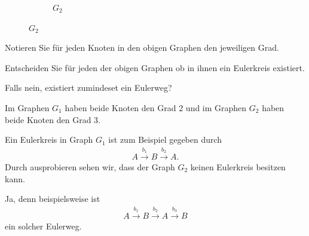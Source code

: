 \begin{myexercise}
\begin{figure}[H]
\begin{subfigure}[b]{0.4\textwidth}
{
}%
\caption*{$G_2$}
\end{subfigure}
\end{figure}
\begin{aenum}
    \item Notieren Sie für jeden Knoten in den obigen Graphen den jeweiligen Grad.
    \item Entscheiden Sie für jeden der obigen Graphen ob in ihnen ein Eulerkreis existiert.
    \item Falls nein, existiert zumindeset ein Eulerweg?
\end{aenum}
\begin{myanswer}\label{aufgabe:04-sol}
\begin{aenum}
    \item Im Graphen $G_1$ haben beide Knoten den Grad 2 und im Graphen $G_2$ haben beide Knoten den Grad 3.
    \item Ein Eulerkreis in Graph $G_1$ ist zum Beispiel gegeben durch
    \begin{align*}
        A \stackrel{b_1}{\longrightarrow} B \stackrel{b_2}{\longrightarrow} A.
    \end{align*}
    Durch ausprobieren sehen wir, dass der Graph $G_2$ keinen Eulerkreis besitzen kann.
    \item Ja, denn beispielsweise ist
    \begin{align*}
        A \stackrel{b_1}{\longrightarrow} B \stackrel{b_2}{\longrightarrow} A \stackrel{b_3}{\longrightarrow} B
    \end{align*}
    ein solcher Eulerweg.
\end{aenum}
\end{myanswer}
\end{myexercise}

